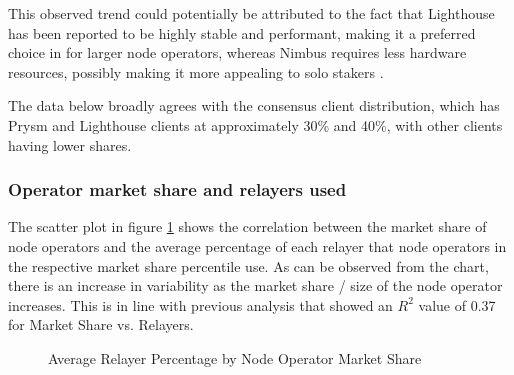 \documentclass[conference]{IEEEtran}
\begin{document}
This observed trend could potentially be attributed to the fact that Lighthouse has been reported to be highly stable and performant, making it a preferred choice in for larger node operators, whereas Nimbus requires less hardware resources, possibly making it more appealing to solo stakers \cite{ranjan2023}.

The data below broadly agrees with the consensus client distribution, which has Prysm and Lighthouse clients at approximately 30\% and 40\%, with other clients having lower shares.


\subsubsection{Operator market share and relayers used}

The scatter plot in figure \ref{fig:average_relayer_percentage_by_percentile} shows the correlation between the market share of node operators and the average percentage of each relayer that node operators in the respective market share percentile use.  As can be observed from the chart, there is an increase in variability as the market share / size of the node operator increases.  This is in line with previous analysis that showed an $R^2$ value of 0.37 for Market Share vs. Relayers.

\begin{figure}[htbp]
  \centering
  \caption{Average Relayer Percentage by Node Operator Market Share}
  \label{fig:average_relayer_percentage_by_percentile}
\end{figure}
\end{document}
